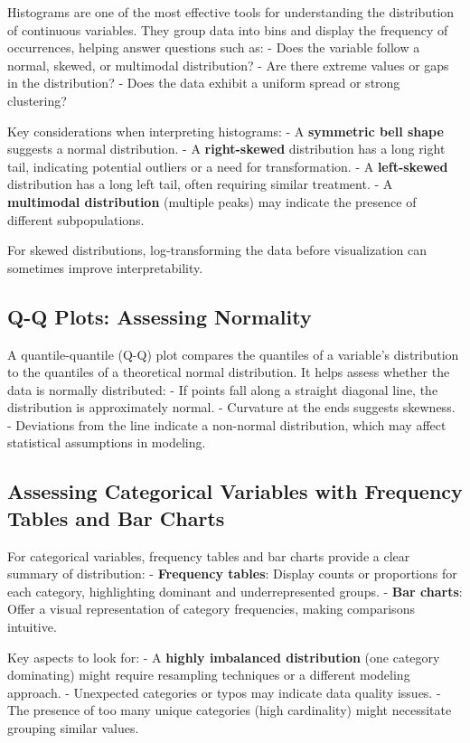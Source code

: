\documentclass[12pt,openany]{book}
\begin{document}
Histograms are one of the most effective tools for understanding the distribution of continuous variables. They group data into bins and display the frequency of occurrences, helping answer questions such as:
- Does the variable follow a normal, skewed, or multimodal distribution?
- Are there extreme values or gaps in the distribution?
- Does the data exhibit a uniform spread or strong clustering?

Key considerations when interpreting histograms:
- A \textbf{symmetric bell shape} suggests a normal distribution.
- A \textbf{right-skewed} distribution has a long right tail, indicating potential outliers or a need for transformation.
- A \textbf{left-skewed} distribution has a long left tail, often requiring similar treatment.
- A \textbf{multimodal distribution} (multiple peaks) may indicate the presence of different subpopulations.

For skewed distributions, log-transforming the data before visualization can sometimes improve interpretability.


\subsection{Q-Q Plots: Assessing Normality}

A quantile-quantile (Q-Q) plot compares the quantiles of a variable’s distribution to the quantiles of a theoretical normal distribution. It helps assess whether the data is normally distributed:
- If points fall along a straight diagonal line, the distribution is approximately normal.
- Curvature at the ends suggests skewness.
- Deviations from the line indicate a non-normal distribution, which may affect statistical assumptions in modeling.


\subsection{Assessing Categorical Variables with Frequency Tables and Bar Charts}

For categorical variables, frequency tables and bar charts provide a clear summary of distribution:
- \textbf{Frequency tables}: Display counts or proportions for each category, highlighting dominant and underrepresented groups.
- \textbf{Bar charts}: Offer a visual representation of category frequencies, making comparisons intuitive.

Key aspects to look for:
- A \textbf{highly imbalanced distribution} (one category dominating) might require resampling techniques or a different modeling approach.
- Unexpected categories or typos may indicate data quality issues.
- The presence of too many unique categories (high cardinality) might necessitate grouping similar values.
\end{document}
